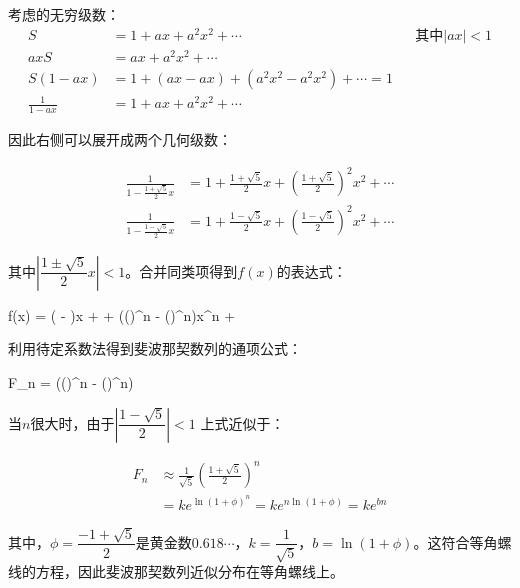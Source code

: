 考虑的无穷级数：
\begin{align*}
S &= 1 + ax + a^2x^2 + \dotsb && \text{其中} |ax| < 1 \\
axS &= ax + a^2x^2 + \dotsb \\
S(1 - ax) &= 1 + (ax - ax) + (a^2x^2 - a^2x^2) + \dotsb = 1 \\
\frac{1}{1 - ax} &= 1 + ax + a^2x^2 + \dotsb
\end{align*}

因此右侧可以展开成两个几何级数：

\begin{align*}
\frac{1}{1 - \frac{1 + \sqrt{5}}{2}x} &= 1 + \frac{1 + \sqrt{5}}{2}x + (\frac{1 + \sqrt{5}}{2})^2x^2 + \dotsb \\
\frac{1}{1 - \frac{1 - \sqrt{5}}{2}x} &= 1 + \frac{1 - \sqrt{5}}{2}x + (\frac{1 - \sqrt{5}}{2})^2x^2 + \dotsb
\end{align*}

其中$|\dfrac{1\pm\sqrt{5}}{2}x| < 1$。合并同类项得到$f(x)$的表达式：

\be
f(x) = ( - )x + \dotsb + (()^n - ()^n)x^n + \dotsb
\ee

利用待定系数法得到斐波那契数列的通项公式：

\be
F_n = (()^n - ()^n)
\ee

当$n$很大时，由于$|\dfrac{1 - \sqrt{5}}{2}| < 1$ 上式近似于：

\begin{align*}
F_n &\approx \frac{1}{\sqrt{5}}(\frac{1 + \sqrt{5}}{2})^n \\
  &= ke^{\ln (1 + \phi)^n} = ke^{n\ln(1 + \phi)} = ke^{bn}
\end{align*}

其中，$\phi = \dfrac{-1 + \sqrt{5}}{2}$是黄金数$0.618\dotsm$，$k = \dfrac{1}{\sqrt{5}}$，$b = \ln (1 + \phi)$。这符合等角螺线的方程，因此斐波那契数列近似分布在等角螺线上。
